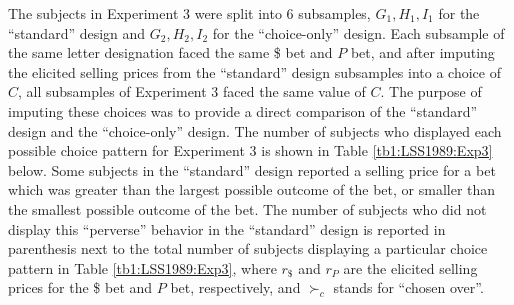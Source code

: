 \documentclass[../main.tex]{subfiles}
\begin{document}
{\begin{table}[hp!]
\begin{tabularx}{\textwidth}{cccYYYYYYYY}
	\end{tabularx}
\end{table}
\clearpage
}

The subjects in Experiment 3 were split into 6 subsamples, $G_1,H_1,I_1$ for the \enquote{standard} design and $G_2,H_2,I_2$ for the \enquote{choice-only} design.
Each subsample of the same letter designation faced the same {\$} bet and $P$ bet, and after imputing the elicited selling prices from the \enquote{standard} design subsamples into a choice of $C$, all subsamples of Experiment 3 faced the same value of $C$.
The purpose of imputing these choices was to provide a direct comparison of the \enquote{standard} design and the  \enquote{choice-only} design.
The number of subjects who displayed each possible choice pattern for Experiment 3 is shown in Table \ref{tb1:LSS1989:Exp3} below.
Some subjects in the \enquote{standard} design reported a selling price for a bet which was greater than the largest possible outcome of the bet, or smaller than the smallest possible outcome of the bet.
The number of subjects who did not display this \enquote{perverse} behavior in the \enquote{standard} design is reported in parenthesis next to the total number of subjects displaying a particular choice pattern in Table \ref{tb1:LSS1989:Exp3}, where $r_{\$}$ and $r_P$ are the elicited selling prices for the {\$} bet and $P$ bet, respectively, and $\succ_c$ stands for \enquote{chosen over}.
\end{document}
